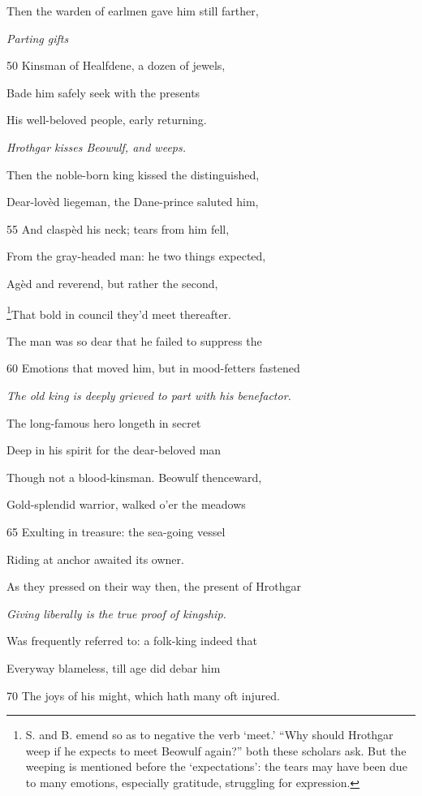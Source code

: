 Then the warden of earlmen gave him still farther,

\emph{Parting gifts}

50
Kinsman of Healfdene, a dozen of jewels,

Bade him safely seek with the presents

His well-beloved people, early returning.

\emph{Hrothgar kisses
Beowulf, and
weeps.}

Then the noble-born king kissed the distinguished,

Dear-lovèd liegeman, the Dane-prince saluted him,

55
And claspèd his neck; tears from him fell,

From the gray-headed man: he two things expected,

Agèd and reverend, but rather the second,

\footnote{S. and B. emend so as to negative the verb ‘meet.’ “Why should
Hrothgar weep if he expects to meet Beowulf again?” both these scholars
ask. But the weeping is mentioned before the ‘expectations’: the tears may
have been due to many emotions, especially gratitude, struggling for expression.}That bold in council they’d meet thereafter.

The man was so dear that he failed to suppress the

60
Emotions that moved him, but in mood-fetters fastened

\emph{The old king is
deeply grieved to
part with his benefactor.}

The long-famous hero longeth in secret

Deep in his spirit for the dear-beloved man

Though not a blood-kinsman. Beowulf thenceward,

Gold-splendid warrior, walked o’er the meadows

65
Exulting in treasure: the sea-going vessel

Riding at anchor awaited its owner.

As they pressed on their way then, the present of Hrothgar

\emph{Giving liberally is
the true proof of
kingship.}

Was frequently referred to: a folk-king indeed that

Everyway blameless, till age did debar him

70
The joys of his might, which hath many oft injured.


